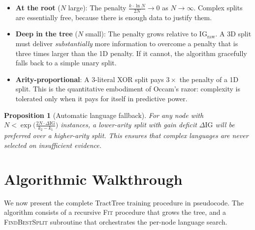 \documentclass[11pt,a4paper]{article}
\newtheorem{proposition}{Proposition}
\begin{document}
\begin{itemize}[leftmargin=2em]
    \item \textbf{At the root} ($N$ large): The penalty $\frac{k \cdot \ln N}{2N} \to 0$ as $N \to \infty$. Complex splits are essentially free, because there is enough data to justify them.
    \item \textbf{Deep in the tree} ($N$ small): The penalty grows relative to $\mathrm{IG}_{\mathrm{raw}}$. A 3D split must deliver \emph{substantially} more information to overcome a penalty that is three times larger than the 1D penalty. If it cannot, the algorithm gracefully falls back to a simple unary split.
    \item \textbf{Arity-proportional}: A 3-literal XOR split pays $3\times$ the penalty of a 1D split. This is the quantitative embodiment of Occam's razor: complexity is tolerated only when it pays for itself in predictive power.
\end{itemize}

\begin{proposition}[Automatic language fallback]
For any node with $N < \exp\!\bigl(\frac{2N \cdot \Delta\mathrm{IG}}{k_2 - k_1}\bigr)$ instances, a lower-arity split with gain deficit $\Delta\mathrm{IG}$ will be preferred over a higher-arity split. This ensures that complex languages are never selected on insufficient evidence.
\end{proposition}


\section{Algorithmic Walkthrough}
\label{sec:algorithm}

We now present the complete TractTree training procedure in pseudocode. The algorithm consists of a recursive \textsc{Fit} procedure that grows the tree, and a \textsc{FindBestSplit} subroutine that orchestrates the per-node language search.
\end{document}
